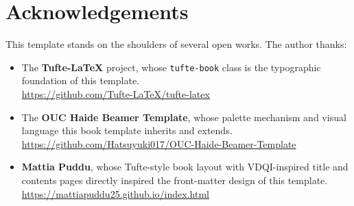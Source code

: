 
% 
% 


\chapter*{Acknowledgements}

This template stands on the shoulders of several open works. The author thanks:

\begin{itemize}
  \item The \textbf{Tufte-LaTeX} project, whose \texttt{tufte-book} class is the typographic
    foundation of this template.\\
    \url{https://github.com/Tufte-LaTeX/tufte-latex}
  \item The \textbf{OUC Haide Beamer Template}, whose palette mechanism and visual
    language this book template inherits and extends.\\
    \url{https://github.com/Hatsuyuki017/OUC-Haide-Beamer-Template}
  \item \textbf{Mattia Puddu}, whose Tufte-style book layout with VDQI-inspired title and
    contents pages directly inspired the front-matter design of this template.\\
    \url{https://mattiapuddu25.github.io/index.html}
\end{itemize}
